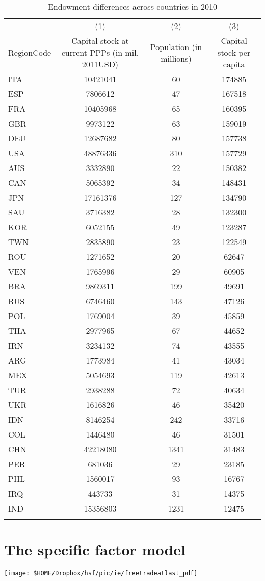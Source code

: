 {\pbn
{}
	
	\begin{table}[H] \centering%
		\caption{Endowment differences across countries in 2010}%
		{\tiny
			\begin{tabularx}{\textwidth}{lCCC}
				\toprule
				&(1)&(2)&(3) \tabularnewline
				RegionCode&Capital stock at current PPPs (in mil. 2011USD)&Population (in millions)&Capital stock per capita \tabularnewline
				\midrule\addlinespace[1.5ex]
				ITA&10421041&60&174885 \tabularnewline
				ESP&7806612&47&167518 \tabularnewline
				FRA&10405968&65&160395 \tabularnewline
				GBR&9973122&63&159019 \tabularnewline
				DEU&12687682&80&157738 \tabularnewline
				USA&48876336&310&157729 \tabularnewline
				AUS&3332890&22&150382 \tabularnewline
				CAN&5065392&34&148431 \tabularnewline
				JPN&17161376&127&134790 \tabularnewline
				SAU&3716382&28&132300 \tabularnewline
				KOR&6052155&49&123287 \tabularnewline
				TWN&2835890&23&122549 \tabularnewline
				ROU&1271652&20&62647 \tabularnewline
				VEN&1765996&29&60905 \tabularnewline
				BRA&9869311&199&49691 \tabularnewline
				RUS&6746460&143&47126 \tabularnewline
				POL&1769004&39&45859 \tabularnewline
				THA&2977965&67&44652 \tabularnewline
				IRN&3234132&74&43555 \tabularnewline
				ARG&1773984&41&43034 \tabularnewline
				MEX&5054693&119&42613 \tabularnewline
				TUR&2938288&72&40634 \tabularnewline
				UKR&1616826&46&35420 \tabularnewline
				IDN&8146254&242&33716 \tabularnewline
				COL&1446480&46&31501 \tabularnewline
				CHN&42218080&1341&31483 \tabularnewline
				PER&681036&29&23185 \tabularnewline
				PHL&1560017&93&16767 \tabularnewline
				IRQ&443733&31&14375 \tabularnewline
				IND&15356803&1231&12475 \tabularnewline
				\bottomrule \addlinespace[1.5ex]
			\end{tabularx}%
		}
		\label{tab:endow}%
	\end{table}%
	
	
	\pbn
	\section{The specific factor model}\label{sec:specific}
	
	\begin{center}
		\texttt{[image: \$HOME/Dropbox/hsf/pic/ie/freetradeatlast\_pdf]}
	\end{center}
	
}
